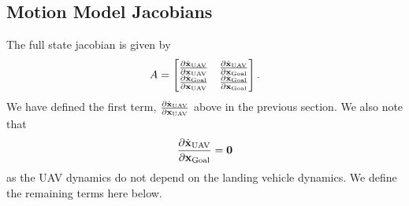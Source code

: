\subsection{Motion Model Jacobians}
The full state jacobian is given by
\begin{equation}
  A =
  \begin{bmatrix}
    \frac{\partial \dot{\boldsymbol{\mathrm{x}}}_{\text{UAV}}}{\partial \boldsymbol{\mathrm{x}}_{\text{UAV}}} &
    \frac{\partial \dot{\boldsymbol{\mathrm{x}}}_{\text{UAV}}}{\partial \boldsymbol{\mathrm{x}}_{\text{Goal}}} \\
    \frac{\partial \dot{\boldsymbol{\mathrm{x}}}_{\text{Goal}}}{\partial \boldsymbol{\mathrm{x}}_{\text{UAV}}} &
    \frac{\partial \dot{\boldsymbol{\mathrm{x}}}_{\text{Goal}}}{\partial \boldsymbol{\mathrm{x}}_{\text{Goal}}} 
  \end{bmatrix}.
\end{equation}
We have defined the first term, $\frac{\partial \dot{\boldsymbol{\mathrm{x}}}_{\text{UAV}}}{\partial
\boldsymbol{\mathrm{x}}_{\text{UAV}}}$ above in the previous section. We also note that
\begin{equation}
  \frac{\partial \dot{\boldsymbol{\mathrm{x}}}_{\text{UAV}}}{\partial \boldsymbol{\mathrm{x}}_{\text{Goal}}} = \boldsymbol{\mathrm{0}}
\end{equation}
as the UAV dynamics do not depend on the landing vehicle dynamics. We define the
remaining terms here below.

